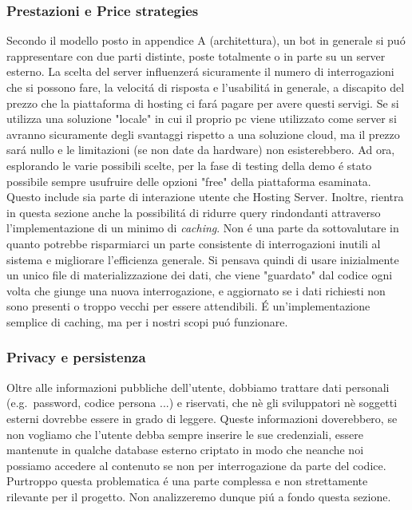 \documentclass[]{article}
\begin{document}
\subsubsection{Prestazioni e Price strategies}
Secondo il modello posto in appendice A (architettura), un bot in generale si puó rappresentare con due parti distinte, poste totalmente o in parte su un server esterno. La scelta del server influenzerá sicuramente il numero di interrogazioni che si possono fare, la velocitá di risposta e l'usabilitá in generale, a discapito del prezzo che la piattaforma di hosting ci fará pagare per avere questi servigi. Se si utilizza una soluzione "locale" in cui il proprio pc viene utilizzato come server si avranno sicuramente degli svantaggi rispetto a una soluzione cloud, ma il prezzo sará nullo e le limitazioni (se non date da hardware) non esisterebbero. Ad ora, esplorando le varie possibili scelte, per la fase di testing della demo é stato possibile sempre usufruire delle opzioni "free" della piattaforma esaminata. Questo include sia parte di  interazione utente che Hosting Server. Inoltre, rientra in questa sezione anche la possibilitá di ridurre query rindondanti attraverso l'implementazione di un minimo di \textit{caching}. Non é una parte da sottovalutare in quanto potrebbe risparmiarci un parte consistente di interrogazioni inutili al sistema e migliorare l'efficienza generale. Si pensava quindi di usare inizialmente un unico file di materializzazione dei dati, che viene "guardato" dal codice ogni volta che giunge una nuova interrogazione, e aggiornato se i dati richiesti non sono presenti o troppo vecchi per essere attendibili. É un'implementazione semplice di caching, ma per i nostri scopi puó funzionare.  

\subsubsection{Privacy e persistenza}
Oltre alle informazioni pubbliche dell'utente, dobbiamo trattare dati personali (e.g.\ password, codice persona ...) e riservati, che nè gli sviluppatori nè soggetti esterni dovrebbe essere in grado di leggere. Queste informazioni doverebbero, se non vogliamo che l'utente debba sempre inserire le sue credenziali, essere mantenute in qualche database esterno criptato in modo che neanche noi possiamo accedere al contenuto se non per interrogazione da parte del codice. Purtroppo questa problematica é una parte complessa e non strettamente rilevante per il progetto. Non analizzeremo dunque piú a fondo questa sezione. 
\end{document}
